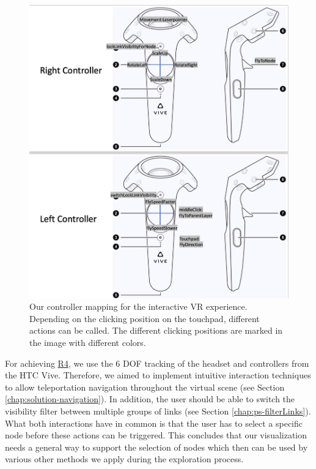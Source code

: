 \begin{figure}[b]
    \centering
    \includegraphics[width=1\textwidth]{graphics/controllerMapping.jpg}
    \caption[Our controller mapping for the interactive VR experience.]{Our controller mapping for the interactive VR experience. Depending on the clicking position on the touchpad, different actions can be called. The different clicking positions are marked in the image with different colors.} 
    \label{fig:controllerMapping} 
\end{figure}
For achieving \hyperref[req:R4]{R4}, we use the 6 DOF tracking of the headset and controllers from the HTC Vive. Therefore, we aimed to implement intuitive interaction techniques to allow teleportation navigation throughout the virtual scene (see Section \ref{chap:solution-navigation}). In addition, the user should be able  to switch the visibility filter between multiple groups of links (see Section \ref{chap:ps-filterLinks}).
What both interactions have in common is that the user has to select a specific node before these actions can be triggered. 
This concludes that our visualization needs a general way to support the selection of nodes which then can be used by various other methods we apply during the exploration process. 
